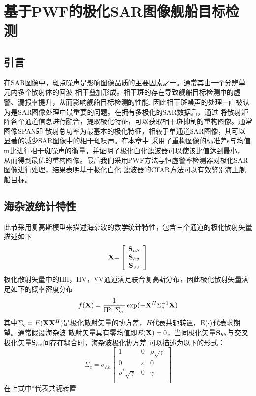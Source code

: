 \chapter{基于PWF的极化SAR图像舰船目标检测}
\label{cha:PWF}

\section{引言}
\label{sec:intro}
在SAR图像中，斑点噪声是影响图像品质的主要因素之一。通常其由一个分辨单元内多个散射体的回波
相干叠加形成。相干斑的存在导致舰船目标检测中的虚警、漏报率提升，从而影响舰船目标检测的性能,
因此相干斑噪声的处理一直被认为是SAR图像处理中最重要的问题。在拥有多极化的SAR数据后，通过
将散射矩阵各个通道信息进行融合，提取极化特征，可以获取相干斑抑制的重构图像。通常图像SPAN即
散射总功率为最基本的极化特征，相较于单通道SAR图像，其可以显著的减少SAR图像中的相干斑噪声。在本章中
采用了重构图像的标准差s与均值m比进行相干斑噪声的衡量，并证明了极化白化滤波器可以使该比值达到最小，
从而得到最优的重构图像。最后我们采用PWF方法与恒虚警率检测器对极化SAR图像进行处理，结果表明基于极化白化
滤波器的CFAR方法可以有效鉴别海上舰船目标。

\section{海杂波统计特性}
    此节采用复高斯模型来描述海杂波的数学统计特性，包含三个通道的极化散射矢量描述如下
    \begin{equation}
      {\bf{X}}{\rm{ = }}\left[ {\begin{array}{*{20}{c}}
        {{{\bf{S}}_{hh}}} \\
        {{{\bf{S}}_{hv}}} \\
        {{{\bf{S}}_{vv}}} 
        \end{array}} \right]   
    \end{equation}
    极化散射矢量中的HH，HV，VV通道满足联合复高斯分布，因此极化散射矢量满足如下的概率密度分布
    \begin{equation}
        f({\bf{X}}) = \frac{1}{{{\Pi ^3}\left| {{\Sigma _c}} \right|}}\exp ( - {{\bf{X}}^H}\Sigma _c^{ - 1}{\bf{X}})
    \end{equation}
    其中${{\Sigma _c}}=E({\bf{X}}{{\bf{X}}^H})$是极化散射矢量的协方差，$H$代表共轭转置，${\rm{E}}( \cdot )$代表求期望。通常假设海杂波
    散射矢量具有零均值即$E({\bf{X}})=0$，当同极化矢量$ {{{\bf{S}}_{hh}}}$与交叉极化矢量${{{\bf{S}}_{hv}}}$间存在耦合时，海杂波极化协方差
    可以描述为以下的形式：
    \begin{equation}
        {\Sigma _c} = {\sigma _{hh}}\left[ {\begin{matrix}
   1 & 0 & {\rho \sqrt \gamma  }  \\ 
   0 & \varepsilon  & 0  \\ 
   {{\rho ^*}\sqrt \gamma  } & 0 & \gamma   \\ 
   \end{matrix}} \right]
    \end{equation}
    在上式中$*$代表共轭转置

